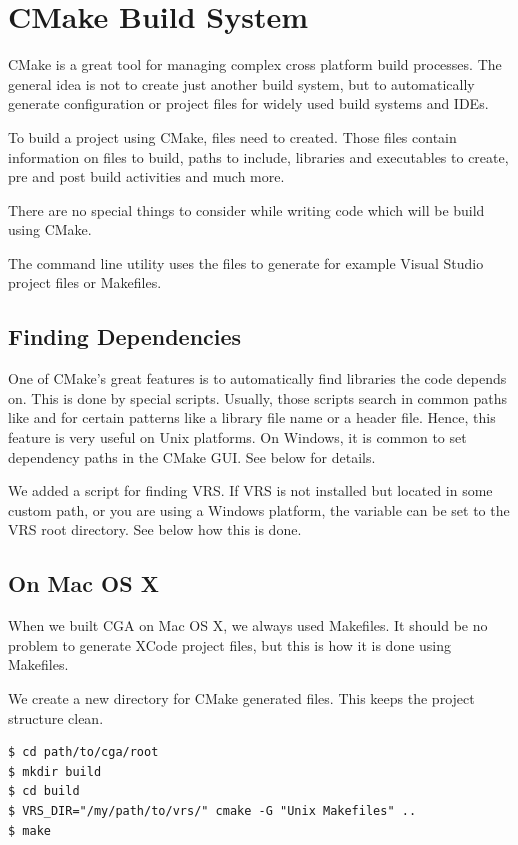 
\section{CMake Build System} CMake is a great tool for managing complex cross platform build processes. The general idea is not to create just another build system, but to automatically generate configuration or project files for widely used build systems and IDEs.

To build a project using CMake,  files need to created. Those files contain information on files to build, paths to include, libraries and executables to create, pre and post build activities and much more.

There are no special things to consider while writing code which will be build using CMake.

The  command line utility uses the  files to generate for example Visual Studio project files or Makefiles.

\subsection{Finding Dependencies} One of CMake's great features is to automatically find libraries the code depends on. This is done by special scripts. Usually, those scripts search in common paths like  and  for certain patterns like a library file name or a header file. Hence, this feature is very useful on Unix platforms. On Windows, it is common to set dependency paths in the CMake GUI. See below for details.

We added a script for finding VRS. If VRS is not installed but located in some custom path, or you are using a Windows platform, the variable  can be set to the VRS root directory. See below how this is done.

\subsection{On Mac OS X} When we built CGA on Mac OS X, we always used Makefiles. It should be no problem to generate XCode project files, but this is how it is done using Makefiles.

We create a new directory for CMake generated files. This keeps the project structure clean.
\begin{verbatim}
$ cd path/to/cga/root
$ mkdir build
$ cd build
$ VRS_DIR="/my/path/to/vrs/" cmake -G "Unix Makefiles" ..
$ make
\end{verbatim}

